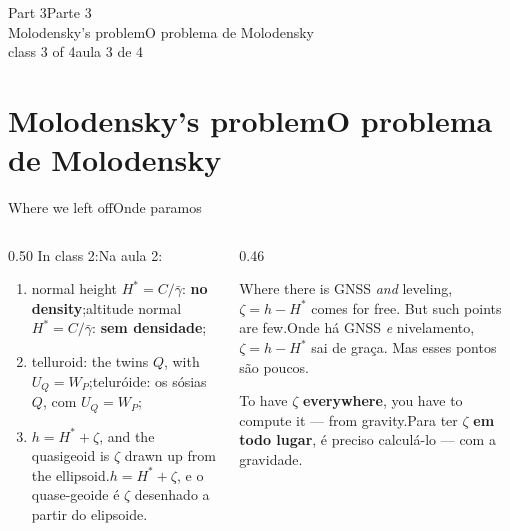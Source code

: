 \documentclass[aspectratio=169,11pt]{beamer}
\newcommand{\tr}[2]{\ifEN#2\else#1\fi}
\newcommand{\bnum}[1]{\textbf{\textcolor{mTeal}{#1}}}
\begin{document}
\begin{frame}[standout]
  \tr{Parte 3}{Part 3}\\[6pt]
  {\normalsize \tr{O problema de Molodensky}{Molodensky's problem}}\\[4pt]
  {\scriptsize \tr{aula 3 de 4}{class 3 of 4}}
\end{frame}

\section{\tr{O problema de Molodensky}{Molodensky's problem}}

\begin{frame}{\tr{Onde paramos}{Where we left off}}
  \begin{columns}[T]
    \begin{column}{0.50\textwidth}
      \tr{Na aula 2:}{In class 2:}
      \begin{enumerate}
        \setlength{\itemsep}{4pt}
        \item \tr{altitude normal $H^{*} = C/\bar\gamma$: \bnum{sem densidade};}{normal height
              $H^{*} = C/\bar\gamma$: \bnum{no density};}
        \item \tr{teluróide: os sósias $Q$, com $U_Q = W_P$;}{telluroid: the twins $Q$, with
              $U_Q = W_P$;}
        \item \tr{$h = H^{*} + \zeta$, e o quase-geoide é $\zeta$ desenhado a partir do
              elipsoide.}{$h = H^{*} + \zeta$, and the quasigeoid is $\zeta$ drawn up from the
              ellipsoid.}
      \end{enumerate}
    \end{column}
    \begin{column}{0.46\textwidth}
      \begin{cuidado}[title={\tr{Falta uma peça}{One piece is missing}}]
        \tr{Onde há GNSS \emph{e} nivelamento, $\zeta = h - H^{*}$ sai de graça. Mas esses
        pontos são poucos.}{Where there is GNSS \emph{and} leveling, $\zeta = h - H^{*}$ comes for
        free. But such points are few.}
        \medskip

        \tr{Para ter $\zeta$ \bnum{em todo lugar}, é preciso calculá-lo --- com a
        gravidade.}{To have $\zeta$ \bnum{everywhere}, you have to compute it --- from
        gravity.}
      \end{cuidado}
    \end{column}
  \end{columns}
\end{frame}
\end{document}
